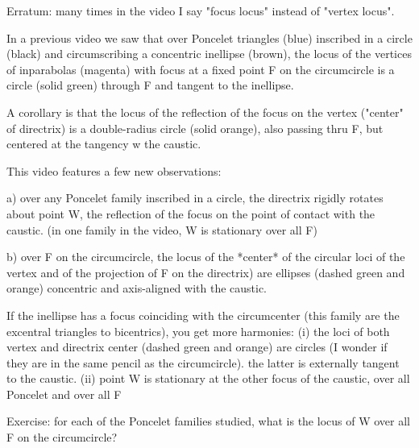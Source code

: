 Erratum: many times in the video I say "focus locus" instead of "vertex locus".

In a previous video we saw that over Poncelet triangles (blue) inscribed in a circle (black) and circumscribing a concentric inellipse (brown), the locus of the vertices of inparabolas (magenta) with focus at a fixed point F on the circumcircle is a circle (solid green) through F and tangent to the inellipse.

A corollary is that the locus of the reflection of the focus on the vertex ("center" of directrix) is a double-radius circle (solid orange), also passing thru F, but centered at the tangency w the caustic.

This video features a few new observations:

a) over any Poncelet family  inscribed in a circle, the directrix rigidly rotates about point W, the reflection of the focus on the point of contact with the caustic. (in one family in the video, W is stationary over all F)

b) over F on the circumcircle, the locus of the *center* of the circular loci of the vertex and of the projection of F on the directrix) are ellipses (dashed green and orange) concentric and axis-aligned with the caustic.

If the inellipse has a focus coinciding with the circumcenter (this family are the excentral triangles to bicentrics), you get more harmonies: (i) the loci of both vertex and directrix center (dashed green and orange) are circles (I wonder if they are in the same pencil as the circumcircle). the latter is  externally tangent to the caustic. (ii) point W is stationary at the other focus of the caustic, over all Poncelet and over all F

Exercise: for each of the Poncelet families studied, what is the locus of W over all F on the circumcircle?